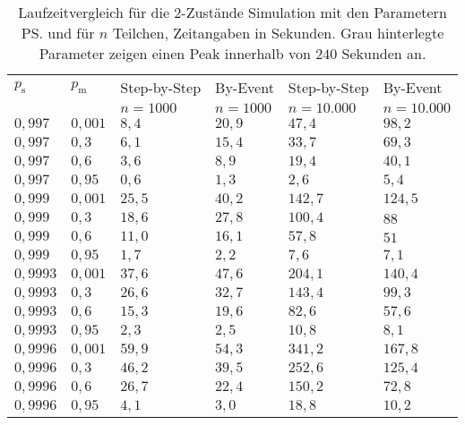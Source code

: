 \begin{table}[h]
\centering
\caption[Laufzeitvergleich für die 2-Zustände Simulation]{Laufzeitvergleich für die 2-Zustände Simulation mit den Parametern \ps und \pm für $n$ Teilchen, Zeitangaben in Sekunden. Grau hinterlegte Parameter zeigen einen Peak innerhalb von $240$ Sekunden an.}
\label{2s_laufzeit}
\begin{tabular}{|l|l||l|l|l|l|} \hline
$p_\text{s}$ & $p_\text{m}$  & Step-by-Step & By-Event & Step-by-Step & By-Event \\ 
 &   & $n=1000$ &$n=1000$ &$n=10.000$ &$n=10.000$  \\ \hline \hline
$0,997  $ & $ 0,001 $ & $ 8,4  $ & $ 20,9  $ & $ 47,4  $ & $98,2  $\\ \hline
$0,997  $ & $ 0,3  $ & $ 6,1  $ & $ 15,4  $ & $ 33,7  $ & $69,3  $\\ \hline
$0,997  $ & $ 0,6  $ & $ 3,6  $ & $ 8,9   $  & $ 19,4 $ & $40,1  $\\ \hline
$0,997  $ & $ 0,95 $ & $ 0,6  $ & $ 1,3   $  & $ 2,6  $ & $5,4   $\\ \hline
$0,999  $ & $ 0,001 $ & $ 25,5 $ & $ 40,2  $ & $ 142,7 $ & $124,5 $\\ \hline
$0,999  $ & $ 0,3  $ & $ 18,6 $ & $ 27,8  $ & $ 100,4 $ & $88    $\\ \hline
$0,999  $ & $ 0,6  $ & $ 11,0 $ & $ 16,1  $ & $ 57,8  $ & $51    $\\ \hline
$0,999  $ & $ 0,95 $ & $ 1,7  $ & $ 2,2   $ & $ 7,6   $ & $7,1   $\\ \hline
$0,9993 $ & $ 0,001 $ & $ 37,6 $ & $ 47,6  $ & $ 204,1 $ & $140,4 $\\ \hline
$0,9993 $ & $ 0,3  $ & $ 26,6 $ & $ 32,7  $ & $ 143,4 $ & $99,3  $\\ \hline
$0,9993 $ & $ 0,6  $ & $ 15,3 $ & $ 19,6  $ & $ 82,6  $ & $57,6  $\\ \hline
$0,9993 $ & $ 0,95 $ & $ 2,3  $ & $ 2,5   $ & $ 10,8  $ & $8,1   $\\ \hline
\cellcolor{gray!25}$0,9996 $ &\cellcolor{gray!25} $ 0,001 $ & $ 59,9$ & $ 54,3 $ & $341,2 $ & $167,8$\\ \hline
$0,9996 $ & $ 0,3  $ & $ 46,2 $ & $ 39,5  $ & $ 252,6 $ & $125,4 $\\ \hline
$0,9996 $ & $ 0,6  $ & $ 26,7 $ & $ 22,4  $ & $ 150,2 $ & $72,8  $\\ \hline
$0,9996 $ & $ 0,95 $ & $ 4,1  $ & $ 3,0   $ & $ 18,8  $ & $10,2  $\\ \hline
\end{tabular}
\end{table}

